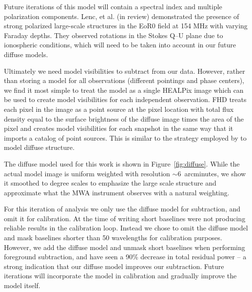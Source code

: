 \documentclass[iop]{emulateapj}
\begin{document}
Future iterations of this model will contain a spectral index 
and multiple polarization components.
Lenc, et al. (in review) demonstrated the presence of strong polarized large-scale structures 
in the EoR0 field at 154 MHz with varying Faraday depths. They observed rotations in the
Stokes Q--U plane due to ionospheric conditions, which will need to be taken into account
in our future diffuse models.

Ultimately we need model visibilities to subtract from our data. However, rather than storing 
a model for all observations (different pointings and phase centers), we find it most simple 
to treat the model as a single HEALPix image which can be used to create model visibilities 
for each independent observation. FHD treats each pixel in the image as a point source at 
the pixel location with total flux density equal to the surface brightness of the diffuse image times the area 
of the pixel and creates model visibilities for each snapshot in the same way that it imports 
a catalog of point sources. This is similar to the strategy employed by 
\citealt{Thyagarajan:2015} to model diffuse structure.

The diffuse model used for this work is shown in Figure~\ref{fig:diffuse}. While the actual 
model image is uniform weighted with resolution $\sim\!6$~arcminutes, we show it 
smoothed to degree scales to emphasize the large scale structure and approximate what 
the MWA instrument observes with a natural weighting.

For this iteration of analysis we only use the diffuse model for subtraction, and omit it for 
calibration. At the time of writing short baselines were not producing reliable results in the 
calibration loop. Instead we chose to omit the diffuse model and mask baselines shorter 
than 50 wavelengths for calibration purposes. However, we add the diffuse model and 
unmask short baselines when performing foreground subtraction, and have seen a 90\% 
decrease in total residual power -- a strong indication that our diffuse model improves our 
subtraction. Future iterations will incorporate the model in calibration and gradually improve 
the model itself. 
\end{document}
